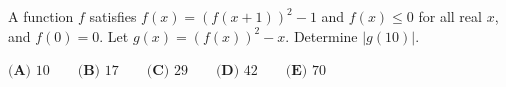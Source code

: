 A function $f$ satisfies $f(x)=\left(f(x+1)\right)^2-1$ and $f(x)\le0$ for all real $x$, and $f(0)=0$. Let $g(x)=\left(f(x)\right)^2-x$. Determine $\left|g(10)\right|$.

$\textbf{(A) }10\qquad\textbf{(B) }17\qquad\textbf{(C) }29\qquad\textbf{(D) }42\qquad\textbf{(E) }70$
